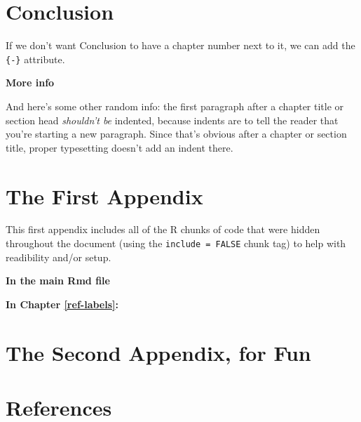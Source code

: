 \documentclass[11pt,twoside]{bristolthesis}
\begin{document}
\hypertarget{conclusion}{%
\chapter*{Conclusion}\label{conclusion}}

If we don't want Conclusion to have a chapter number next to it, we can add the \texttt{\{-\}} attribute.

\textbf{More info}

And here's some other random info: the first paragraph after a chapter title or section head \emph{shouldn't be} indented, because indents are to tell the reader that you're starting a new paragraph. Since that's obvious after a chapter or section title, proper typesetting doesn't add an indent there.

\appendix

\hypertarget{the-first-appendix}{%
\chapter{The First Appendix}\label{the-first-appendix}}

This first appendix includes all of the R chunks of code that were hidden throughout the document (using the \texttt{include\ =\ FALSE} chunk tag) to help with readibility and/or setup.

\textbf{In the main Rmd file}

\textbf{In Chapter \ref{ref-labels}:}

\hypertarget{the-second-appendix-for-fun}{%
\chapter{The Second Appendix, for Fun}\label{the-second-appendix-for-fun}}

\backmatter

\hypertarget{references}{%
\chapter*{References}\label{references}}


\noindent

\setlength{\parindent}{-0.20in}
\setlength{\leftskip}{0.20in}
\setlength{\parskip}{8pt}
\end{document}
